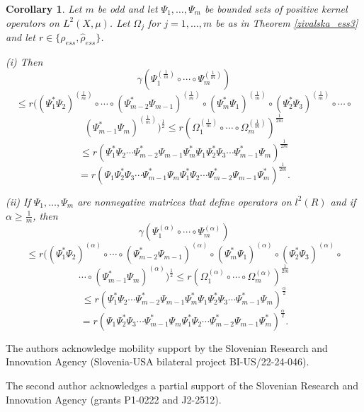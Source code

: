 \documentclass[12pt, reqno]{amsart}
\newtheorem{corollary}[theorem]{Corollary}
\theoremstyle{definition}
\theoremstyle{remark}
\newtheorem{remark}[theorem]{Remark}
\numberwithin{equation}{section}
\newcommand{\be}{\begin{equation}}
\newcommand{\ee}{\end{equation}}
\begin{document}
\begin{corollary}
Let $m$ be odd and let $\Psi_1, \ldots , \Psi_m$ be bounded sets of positive kernel operators on $L^2(X, \mu)$. Let $\Omega_j$ for $j=1, \ldots, m$ be as in Theorem \ref{zivalska_ess3} and let $r\in\{\rho_{ess}, \hat{\rho}_{ess}\}$.

\noindent  (i) Then
$$\gamma(\Psi_1^{(\frac{1}{m})}\circ\cdots\circ\Psi_m^{(\frac{1}{m})})$$
$$\le r((\Psi_1^*\Psi_2)^{(\frac{1}{m})}\circ\cdots\circ(\Psi_{m-2}^*\Psi_{m-1})^{(\frac{1}{m})}\circ(\Psi_m^*\Psi_1)^{(\frac{1}{m})}\circ(\Psi_2^*\Psi_3)^{(\frac{1}{m})}\circ\cdots\circ$$
$$(\Psi_{m-1}^*\Psi_{m})^{(\frac{1}{m})})^{\frac{1}{2}}\le r(\Omega_1^{(\frac{1}{m})}\circ\cdots\circ\Omega_m^{(\frac{1}{m})})^{\frac{1}{2m}}$$
$$\le r(\Psi_1^*\Psi_2\cdots\Psi_{m-2}^*\Psi_{m-1}\Psi_m^*\Psi_1\Psi_2^*\Psi_3\cdots\Psi_{m-1}^*\Psi_{m})^{\frac{1}{2m}}$$
\be
\nonumber
=r(\Psi_1\Psi_2^*\Psi_3\cdots\Psi_{m-1}^*\Psi_{m}\Psi_1^*\Psi_2\cdots\Psi_{m-2}^*\Psi_{m-1}\Psi_m^*)^{\frac{1}{2m}}.
\label{sonce}
\ee

\noindent (ii) If $\Psi_1, \ldots , \Psi_m$ are nonnegative matrices that define operators on $l^2(R)$ and if $\alpha\ge\frac{1}{m}$, then
$$\gamma(\Psi_1^{(\alpha)}\circ\cdots\circ\Psi_m^{(\alpha)})$$
$$\le r((\Psi_1^*\Psi_2)^{(\alpha)}\circ\cdots\circ(\Psi_{m-2}^*\Psi_{m-1})^{(\alpha)}\circ(\Psi_m^*\Psi_1)^{(\alpha)}\circ(\Psi_2^*\Psi_3)^{(\alpha)}\circ$$
$$\cdots\circ(\Psi_{m-1}^*\Psi_{m})^{(\alpha)})^{\frac{1}{2}} \le r(\Omega_1^{(\alpha)}\circ\cdots\circ\Omega_m^{(\alpha)})^{\frac{1}{2m}}$$
$$\le r(\Psi_1^*\Psi_2\cdots\Psi_{m-2}^*\Psi_{m-1}\Psi_m^*\Psi_1\Psi_2^*\Psi_3\cdots\Psi_{m-1}^*\Psi_{m})^{\frac{\alpha}{2}}$$
\be
\nonumber
=r(\Psi_1\Psi_2^*\Psi_3\cdots\Psi_{m-1}^*\Psi_{m}\Psi_1^*\Psi_2\cdots\Psi_{m-2}^*\Psi_{m-1}\Psi_m^*)^{\frac{\alpha}{2}}.
\label{veter}
\ee 
\end{corollary}


\bigskip

The authors acknowledge  mobility support by the Slovenian Research and Innovation Agency (Slovenia-USA bilateral project BI-US/22-24-046).

 The second author acknowledges a partial support of  the Slovenian Research and Innovation Agency (grants P1-0222 %
 and J2-2512).
\end{document}
